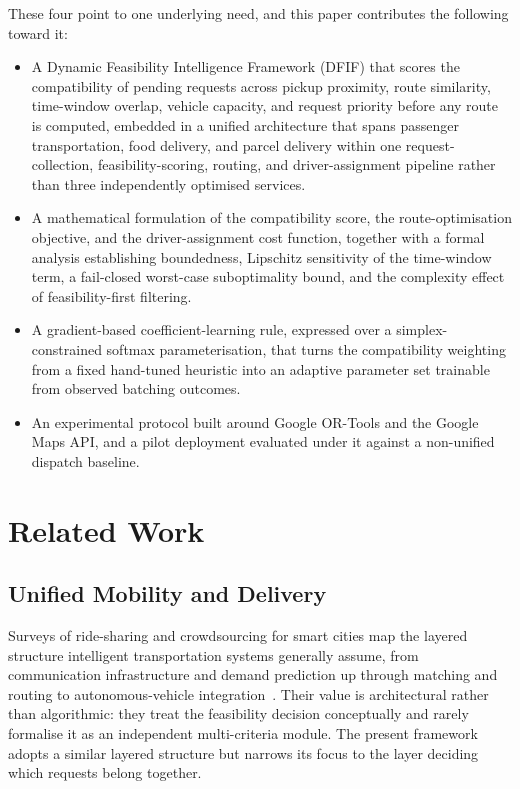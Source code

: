 \documentclass[conference]{IEEEtran}
\begin{document}
These four point to one underlying need, and this paper contributes the
following toward it:

\begin{itemize}
\item A Dynamic Feasibility Intelligence Framework (DFIF) that scores the
compatibility of pending requests across pickup proximity, route similarity,
time-window overlap, vehicle capacity, and request priority before any route
is computed, embedded in a unified architecture that spans passenger
transportation, food delivery, and parcel delivery within one
request-collection, feasibility-scoring, routing, and driver-assignment
pipeline rather than three independently optimised services.
\item A mathematical formulation of the compatibility score, the
route-optimisation objective, and the driver-assignment cost function,
together with a formal analysis establishing boundedness, Lipschitz
sensitivity of the time-window term, a fail-closed worst-case suboptimality
bound, and the complexity effect of feasibility-first filtering.
\item A gradient-based coefficient-learning rule, expressed over a
simplex-constrained softmax parameterisation, that turns the compatibility
weighting from a fixed hand-tuned heuristic into an adaptive parameter set
trainable from observed batching outcomes.
\item An experimental protocol built around Google OR-Tools and the Google
Maps API, and a pilot deployment evaluated under it against a
non-unified dispatch baseline.
\end{itemize}

\section{Related Work}

\subsection{Unified Mobility and Delivery}
Surveys of ride-sharing and crowdsourcing for smart cities map the layered
structure intelligent transportation systems generally assume, from
communication infrastructure and demand prediction up through matching and
routing to autonomous-vehicle integration~\cite{seng2023}. Their value is
architectural rather than algorithmic: they treat the feasibility decision
conceptually and rarely formalise it as an independent multi-criteria module.
The present framework adopts a similar layered structure but narrows its focus
to the layer deciding which requests belong together.
\end{document}

